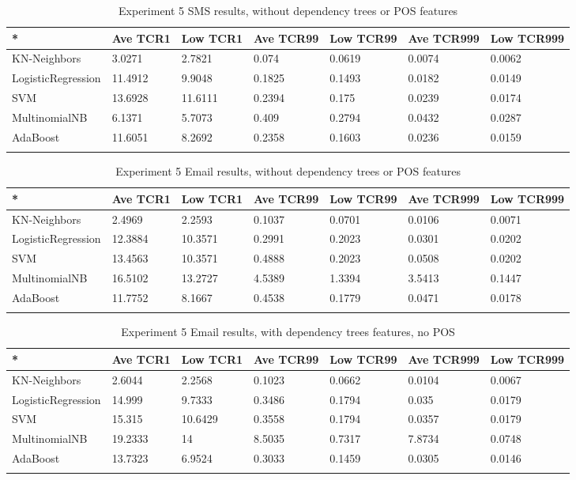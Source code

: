 \documentclass[11pt,a4paper]{article}
\begin{document}
\begin{table}[t!]
\centering
\begin{tabular}{lllllll}
 *& Ave TCR1 &Low TCR1&Ave TCR99&Low TCR99&Ave TCR999&Low TCR999\\
  \hline
  KN-Neighbors& 3.0271&	2.7821	&0.074&	0.0619&	0.0074&	0.0062	\\
LogisticRegression&11.4912&	9.9048&	0.1825&	0.1493&	0.0182&	0.0149	\\
SVM& 13.6928&	11.6111	&0.2394&	0.175&	0.0239&	0.0174	\\
MultinomialNB &6.1371&	5.7073&	0.409&	0.2794&	0.0432&	0.0287	\\
AdaBoost& 11.6051&	8.2692&	0.2358&	0.1603&	0.0236&	0.0159	\\

 \\
\end{tabular}
\caption{Experiment 5 SMS results, without dependency trees or POS features}
\end{table}

\begin{table}[t!]
\centering
\begin{tabular}{lllllll}
 *& Ave TCR1 &Low TCR1&Ave TCR99&Low TCR99&Ave TCR999&Low TCR999\\
  \hline
  KN-Neighbors& 2.4969&	2.2593&	0.1037&	0.0701&	0.0106&	0.0071	\\
LogisticRegression&12.3884	&10.3571	&0.2991&	0.2023&	0.0301	&0.0202	\\
SVM& 13.4563&	10.3571	&0.4888&	0.2023&	0.0508&	0.0202	\\
MultinomialNB &16.5102&	13.2727	&4.5389&	1.3394&	3.5413&	0.1447	\\
AdaBoost& 11.7752&	8.1667&	0.4538&	0.1779&	0.0471&	0.0178	\\

 \\
\end{tabular}
\caption{Experiment 5 Email results, without dependency trees or POS features}
\end{table}

\begin{table}[t!]
\centering
\begin{tabular}{lllllll}
 *& Ave TCR1 &Low TCR1&Ave TCR99&Low TCR99&Ave TCR999&Low TCR999\\
  \hline
  KN-Neighbors& 2.6044&	2.2568&	0.1023&	0.0662&	0.0104&	0.0067	\\
LogisticRegression&14.999&	9.7333&	0.3486&	0.1794&	0.035&	0.0179	\\
SVM& 15.315	&10.6429&	0.3558&	0.1794&	0.0357&	0.0179	\\
MultinomialNB &19.2333&	14&	8.5035&	0.7317&	7.8734&	0.0748	\\
AdaBoost& 13.7323&	6.9524&	0.3033&	0.1459&	0.0305&	0.0146	\\

 \\
\end{tabular}
\caption{Experiment 5 Email results, with dependency trees features, no POS}
\end{table}
\end{document}
